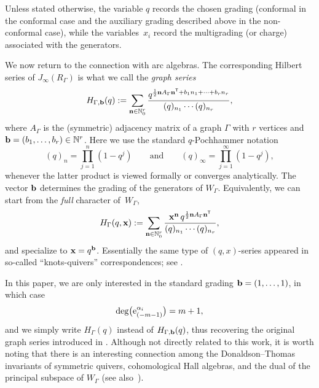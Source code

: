 \documentclass[10pt,a4paper]{amsart}
\numberwithin{equation}{section}
\theoremstyle{definition}
\begin{document}
Unless stated otherwise, the variable $q$ records the chosen grading
(conformal in the conformal case and the auxiliary grading described above in
the non-conformal case), while the variables~$x_i$ record the multigrading (or
charge) associated with the generators.

We now return to the connection with arc algebras.
The corresponding Hilbert series of $J_\infty(R_\Gamma)$ is what we call the {\em graph series}
\begin{equation*}%
H_{\Gamma,{\bf b}}(q):=\sum_{{\bf n} \in\mathbb{N}_0^r}
\frac{q^{\frac12 {\bf n}A_\Gamma{\bf n}^{\mathsf{T}}+b_1n_1+\cdots+b_rn_r}}
{(q)_{n_1}\cdots(q)_{n_r}},
\end{equation*}
where $A_\Gamma$ is the (symmetric) adjacency matrix of a graph $\Gamma$ with $r$ vertices and ${\bf b}=(b_1,\dots,b_r)\in\mathbb{N}^r$.
Here we use the standard $q$-Pochhammer notation
\[
(q)_n=\prod_{j=1}^n(1-q^j) \qquad \text{and} \qquad (q)_\infty=\prod_{j=1}^\infty(1-q^j),
\]
 whenever the latter product is viewed formally or converges analytically.
The vector ${\bf b}$ determines the grading of the generators of $W_\Gamma$. Equivalently, we can start from the {\em full} character of~$W_\Gamma$,
\begin{equation*}%
H_{\Gamma}(q,{\bf x}):=
\sum_{{\bf n}\in\mathbb{N}_0^r}
\frac{{\bf x}^{\bf n}\,
q^{\frac12{\bf n}A_\Gamma{\bf n}^{\mathsf{T}}}}
{(q)_{n_1}\cdots(q)_{n_r}},
\end{equation*}
and specialize to ${\bf x}=q^{\bf b}$. Essentially the same type of $(q,x)$-series appeared in so-called ``knots-quivers'' correspondences; see \cite{Ekholm,Quivers}.

In this paper, we are only interested in the standard grading ${\bf b}=(1,\dots,1)$, in which case
\[
\deg \bigl({\rm e}^{\alpha_i}_{(-m-1)}\bigr)=m+1,
\]
and we simply write $H_\Gamma(q)$ instead of $H_{\Gamma,{\bf b}}(q)$, thus recovering the original graph series introduced in \cite{BJM,JM1,JM2}. Although not directly related to this work, it is worth noting that there is an interesting connection among the Donaldson--Thomas invariants of symmetric quivers, cohomological Hall algebras, and the dual of the principal subspace of $W_{\Gamma}$ \cite{DFR,DM} (see also~\cite{Efimov}).
\end{document}
